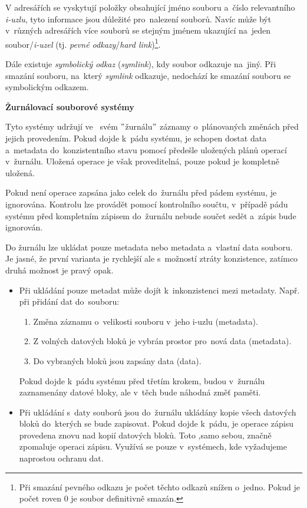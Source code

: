 V adresářích se vyskytují položky obsahující jméno souboru a~číslo relevantního \emph{i-uzlu}, tyto informace jsou důležité pro~nalezení souborů. Navíc může být v~různých adresářích více souborů se stejným jménem ukazující na~jeden soubor/\emph{i-uzel} (tj. \emph{pevné odkazy}/\emph{hard link})\footnote{Při smazání pevného odkazu je počet těchto odkazů snížen o~jedno. Pokud je počet roven 0 je soubor definitivně smazán.}.

\vspace{0,5cm}

Dále existuje \emph{symbolický odkaz} (\emph{symlink}), kdy soubor odkazuje na~jiný. Při smazání souboru, na~který \emph{symlink} odkazuje, nedochází ke smazání souboru se symbolickým odkazem. 

\clearpage

\begin{Large}
    \textbf{Žurnálovací souborové systémy}
\end{Large}

Tyto systémy udržují ve~ svém $"$žurnálu$"$ záznamy o~plánovaných změnách před jejich provedením. Pokud dojde k~pádu systému, je schopen dostat data a~metadata do~konzistentního stavu pomocí předešle uložených plánů operací v~žurnálu. 
Uložená operace je však proveditelná, pouze pokud je kompletně uložená. 

\vspace{0,5cm}

Pokud není operace zapsána jako celek do~žurnálu před pádem systému, je ignorována. Kontrolu lze provádět pomocí kontrolního součtu, v~případě pádu systému před kompletním zápisem do~žurnálu nebude součet sedět a~zápis bude ignorován.

\vspace{0,5cm}

Do žurnálu lze ukládat pouze metadata nebo metadata a~vlastní data souboru. Je jasné, že první varianta je rychlejší ale s~možností ztráty konzistence, zatímco druhá možnost je pravý opak.

\begin{itemize}
    \item Při ukládání pouze metadat může dojít k~inkonzistenci mezi metadaty. Např. při přidání dat do~souboru:
    \begin{enumerate}
        \item Změna záznamu o~velikosti souboru v~jeho i-uzlu (metadata).
        \item Z volných datových bloků je vybrán prostor pro~nová data (metadata).
        \item Do vybraných bloků jsou zapsány data (data). 
    \end{enumerate}
    Pokud dojde k~pádu systému před třetím krokem, budou v~žurnálu zaznamenány datové bloky, ale v~těch bude náhodná změť paměti. 
    
    \item Při ukládání s~daty souborů jsou do~žurnálu ukládány kopie všech datových bloků do~kterých se bude zapisovat. Pokud dojde k~pádu, je operace zápisu provedena znovu nad kopií datových bloků. Toto ,samo sebou, značně zpomaluje operaci zápisu. Využívá se pouze v~systémech, kde vyžadujeme naprostou ochranu dat. 
\end{itemize}

